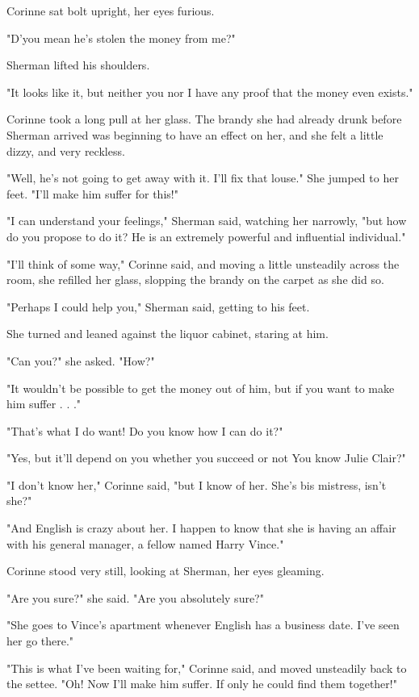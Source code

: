 \documentclass{novel}
\begin{document}
Corinne sat bolt upright, her eyes furious.

"D'you mean he's stolen the money from me?"

Sherman lifted his shoulders.

"It looks like it, but neither you nor I have any proof that the money even exists."

Corinne took a long pull at her glass. The brandy she had already drunk before Sherman arrived was beginning to have an effect on her, and she felt a little dizzy, and very reckless.

"Well, he's not going to get away with it. I'll fix that louse." She jumped to her feet. "I'll make him suffer for this!"

"I can understand your feelings," Sherman said, watching her narrowly, "but how do you propose to do it? He is an extremely powerful and influential individual."

"I'll think of some way," Corinne said, and moving a little unsteadily across the room, she refilled her glass, slopping the brandy on the carpet as she did so.

"Perhaps I could help you," Sherman said, getting to his feet.

She turned and leaned against the liquor cabinet, staring at him.

"Can you?" she asked. "How?"

"It wouldn't be possible to get the money out of him, but if you want to make him suffer . . ."

"That's what I do want! Do you know how I can do it?"

"Yes, but it'll depend on you whether you succeed or not You know Julie Clair?"

"I don't know her," Corinne said, "but I know of her. She's bis mistress, isn't she?"

"And English is crazy about her. I happen to know that she is having an affair with his general manager, a fellow named Harry Vince."

Corinne stood very still, looking at Sherman, her eyes gleaming.

"Are you sure?" she said. "Are you absolutely sure?"

"She goes to Vince's apartment whenever English has a business date. I've seen her go there."

"This is what I've been waiting for," Corinne said, and moved unsteadily back to the settee. "Oh! Now I'll make him suffer. If only he could find them together!"
\end{document}
